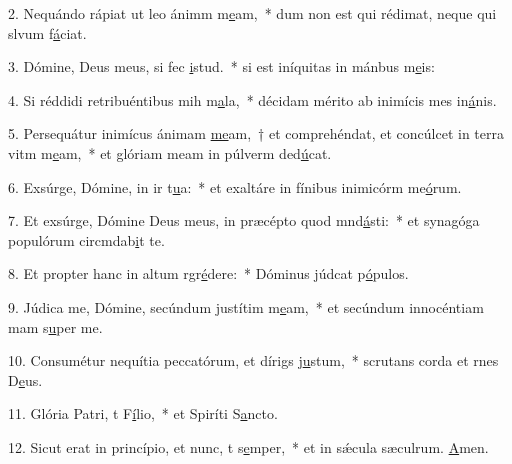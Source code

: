 2. Nequándo rápiat ut leo ánimm m\uline{e}am,~* dum non est qui rédimat, neque qui slvum f\uline{á}ciat.\par 
3. Dómine, Deus meus, si fec \uline{i}stud.~* si est iníquitas in mánbus m\uline{e}is:\par 
4. Si réddidi retribuéntibus mih m\uline{a}la,~* décidam mérito ab inimícis mes in\uline{á}nis.\par 
5. Persequátur inimícus ánimam \uline{me}am,~† et comprehéndat, et concúlcet in terra vitm m\uline{e}am,~* et glóriam meam in púlverm ded\uline{ú}cat.\par 
6. Exsúrge, Dómine, in ir t\uline{u}a:~* et exaltáre in fínibus inimicórm me\uline{ó}rum.\par 
7. Et exsúrge, Dómine Deus meus, in præcépto quod mnd\uline{á}sti:~* et synagóga populórum circmdab\uline{i}t te.\par 
8. Et propter hanc in altum rgr\uline{é}dere:~* Dóminus júdcat p\uline{ó}pulos.\par 
9. Júdica me, Dómine, secúndum justítim m\uline{e}am,~* et secúndum innocéntiam mam s\uline{u}per me.\par 
10. Consumétur nequítia peccatórum, et dírigs j\uline{u}stum,~* scrutans corda et rnes D\uline{e}us.\par 
11. Glória Patri, t F\uline{í}lio,~* et Spiríti S\uline{a}ncto.\par 
12. Sicut erat in princípio, et nunc, t s\uline{e}mper,~* et in sǽcula sæculrum. \uline{A}men.\par 
